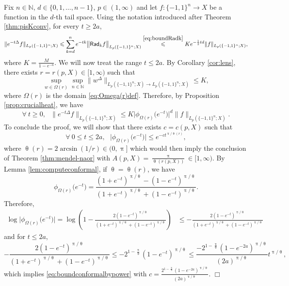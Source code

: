 \documentclass[11pt,reqno]{amsart}
\renewcommand{\leq}{\leqslant}
\renewcommand{\geq}{\geqslant}
\renewcommand{\pi}{\uppi}
\newcommand{\1}{\mathbf 1}
\theoremstyle{remark}
\newcommand{\N}{\mathbb N}
\renewcommand{\theta}{\uptheta}
\renewcommand{\pi}{\uppi}
\renewcommand{\pi}{\uppi}
\newcommand{\msf}{\mathsf}
\begin{document}
 Fix $n\in\N$, $d\in\{0,1,\ldots,n-1\}$, $p\in(1,\infty)$ and let $f:\{-1,1\}^n\to X$ be a function in the $d$-th tail space. Using the notation introduced after Theorem \ref{thm:pisKconv}, for every $t\geq 2a$,
\begin{equation}
\begin{split}
\|e^{-t\Delta}f\|_{L_p(\{-1,1\}^n;X)} \leq \sum_{k=d}^n e^{-tk} \big\|\msf{Rad}_kf\big\|_{L_p(\{-1,1\}^n;X)}
 \stackrel{\eqref{eq:boundRadk}}{\leq} Ke^{-\frac{1}{2}td} \|f\|_{L_p(\{-1,1\}^n;X)},
\end{split}
\end{equation}
where $K=\frac{M}{1-e^{-a}}$. We will now treat the range $t\leq 2a$. By Corollary \ref{cor:lens}, there exists $r=r(p,X)\in[1,\infty)$ such that
\begin{equation}
\sup_{w\in\Omega(r)} \sup_{n\in\N} \|w^\Delta\|_{{L_p(\{-1,1\}^n;X)}\to {L_p(\{-1,1\}^n;X)}} \leq K,
\end{equation}
where $\Omega(r)$ is the domain \eqref{eq:Omega(r)def}. Therefore, by Proposition \ref{prop:crucialheat}, we have
\begin{equation}
\forall \ t\geq0, \ \ \ \|e^{-t\Delta}f\|_{L_p(\{-1,1\}^n;X)} \leq K \big|\phi_{\Omega(r)}\big(e^{-t}\big)\big|^d \|f\|_{L_p(\{-1,1\}^n;X)}.
\end{equation}
To conclude the proof, we will show that there exists $c=c(p,X)$ such that
\begin{equation} \label{eq:boundconformalbypower}
\forall \ 0\leq t\leq 2a, \ \ \ \big|\phi_{\Omega(r)}\big(e^{-t}\big)\big| \leq e^{-c t^{\pi/\theta(r)}},
\end{equation}
where $\theta(r) = 2\arcsin(1/r) \in (0,\pi]$ which would then imply the conclusion of Theorem \ref{thm:mendel-naor} with $A(p,X) = \frac{\pi}{\theta(r(p,X))} \in[1,\infty)$. By Lemma \ref{lem:computeconformal}, if $\theta=\theta(r)$, we have
\begin{equation} \label{eq:phiomegar}
\phi_{\Omega(r)}\big(e^{-t}\big) = \frac{(1+e^{-t})^{\pi/\theta}- (1-e^{-t})^{\pi/\theta}}{(1+e^{-t})^{\pi/\theta} + (1-e^{-t})^{\pi/\theta}}.
\end{equation}
Therefore, 
\begin{equation}
\begin{split}
\log\big|\phi_{\Omega(r)}\big(e^{-t}\big)\big| = \log\left( 1- \frac{2(1-e^{-t})^{\pi/\theta}}{(1+e^{-t})^{\pi/\theta} + (1-e^{-t})^{\pi/\theta}}\right) & \leq - \frac{2(1-e^{-t})^{\pi/\theta}}{(1+e^{-t})^{\pi/\theta} + (1-e^{-t})^{\pi/\theta}}
\end{split}
\end{equation}
and for $t\leq2a$,
\begin{equation}
 - \frac{2(1-e^{-t})^{\pi/\theta}}{(1+e^{-t})^{\pi/\theta} + (1-e^{-t})^{\pi/\theta}} \leq -2^{1-\frac{\pi}{\theta}}(1-e^{-t})^{\pi/\theta} \leq \frac{-2^{1-\frac{\pi}{\theta}}(1-e^{-2a})^{\pi/\theta}}{(2a)^{\pi/\theta}} t^{\pi/\theta},
\end{equation}
which implies \eqref{eq:boundconformalbypower} with $c = \frac{2^{1-\frac{\pi}{\theta}}(1-e^{-2a})^{\pi/\theta}}{(2a)^{\pi/\theta}}$.
\hfill$\Box$
\end{document}
